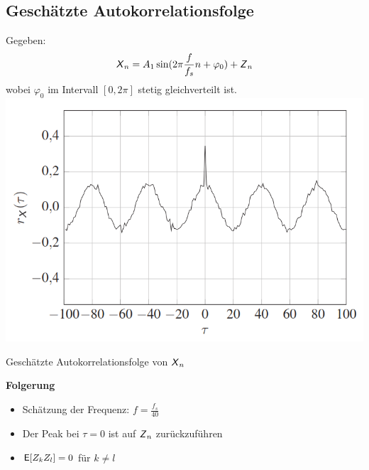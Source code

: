 \documentclass[deutsch]{latex4ei/latex4ei_sheet}
\begin{document}
\begin{sectionbox}
	\subsection{Geschätzte Autokorrelationsfolge}
	Gegeben:
	\[\operatorname{\textsf{\textit{X}}}_n=A_1 \sin(2\pi\frac{f}{f_s}n+\varphi_0)+\operatorname{\textsf{\textit{Z}}}_n\]
	wobei $\varphi_0$ im Intervall $[0,2\pi]$ stetig gleichverteilt ist.\\
	\includegraphics[width = \textwidth]{img/autokorrelation-graph.png}
	\begin{center}		
		Geschätzte Autokorrelationsfolge von $\operatorname{\textsf{\textit{X}}}_n$\\
	\end{center}
	\textbf{Folgerung}
	\begin{itemize}
		\item Schätzung der Frequenz: $f=\frac{f_s}{40}$
		\item Der Peak bei $\tau = 0$ ist auf $\operatorname{\textsf{\textit{Z}}}_n$ zurückzuführen
		\item $\operatorname{\textsf{E}}[Z_kZ_l]=0$ für $k\ne l$
	\end{itemize}
	


	
	
\end{sectionbox}

\end{document}
